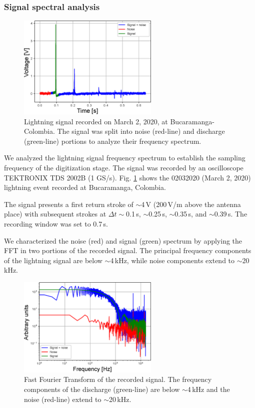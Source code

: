 \documentclass[letterpaper,12pt]{article}
\begin{document}
\subsubsection{Signal spectral analysis}

\begin{figure}[h!]
\begin{center}
\includegraphics[width=0.6\textwidth]{Figures/Descarga.eps}
\caption{Lightning signal recorded on March 2, 2020, at Bucaramanga-Colombia. The signal was split into noise (red-line) and discharge (green-line) portions to analyze their frequency spectrum.}
\label{fig::descarga}
\end{center}
\end{figure}


We analyzed the lightning signal frequency spectrum to establish the sampling frequency of the digitization stage. The signal was recorded by an oscilloscope TEKTRONIX TDS 2002B (1 GS/s). Fig. \ref{fig::descarga} shows the 02032020 (March 2, 2020) lightning event recorded at Bucaramanga, Colombia. 

The signal presents a first return stroke of $\sim$4\,V (200\,V/m above the antenna place) with subsequent strokes at $\Delta t \sim$0.1\,s, $\sim$0.25\,s, $\sim$0.35\,s, and $\sim$0.39\,s. The recording window was set to 0.7\,s. 

We characterized the noise (red) and signal (green) spectrum by applying the FFT in two portions of the recorded signal. The principal frequency components of the lightning signal are below $\sim$4\,kHz, while noise components extend to $\sim$20\,kHz.

\begin{figure}[h!]
\begin{center}
\includegraphics[width=0.6\textwidth]{Figures/Evento_FFT.eps}
\caption{Fast Fourier Transform of the recorded signal. The frequency components of the discharge (green-line) are below $\sim$4\,kHz and the noise (red-line) extend to $\sim$20\,kHz.}
\label{fig::fftsignal}
\end{center}
\end{figure}
\end{document}
